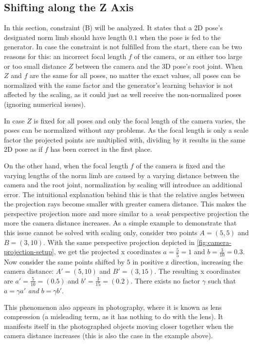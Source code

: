 	
\subsection{Shifting along the Z Axis}
\label{sec:z-shift-error}

In this section, constraint (B) will be analyzed.
It states that a 2D pose's designated norm limb should have length $0.1$ when the pose is fed to the generator.
In case the constraint is not fulfilled from the start, there can be two reasons for this: 
an incorrect focal length $f$ of the camera, or an either too large or too small distance $Z$ between the camera and the 3D pose's root joint.
When $Z$ and $f$ are the same for all poses, no matter the exact values, all poses can be normalized with the same factor and the generator's learning behavior is not affected by the scaling, as it could just as well receive the non-normalized poses (ignoring numerical issues).

In case $Z$ is fixed for all poses and only the focal length of the camera varies, the poses can be normalized without any problems.
As the focal length is only a scale factor the projected points are multiplied with, dividing by it results in the same 2D pose as if $f$ has been correct in the first place.

On the other hand, when the focal length $f$ of the camera is fixed and the varying lengths of the norm limb are caused by a varying distance between the camera and the root joint, normalization by scaling will introduce an additional error.
The intuitional explanation behind this is that the relative angles between the projection rays become smaller with greater camera distance.
This makes the perspective projection more and more similar to a \emph{weak} perspective projection the more the camera distance increases.
As a simple example to demonstrate that this issue cannot be solved with scaling only, consider two points $A = (5, 5)$ and $B = (3, 10)$. 
With the same perspective projection depicted in \autoref{fig:camera-projection-setup}, we get the projected x coordinates $a = \frac{5}{5} = 1$ and $b = \frac{3}{10} = 0.3$.
Now consider the same points shifted by $5$ in positive z direction, increasing the camera distance: $A' = (5, 10)$ and $B' = (3, 15)$.
The resulting x coordinates are $a' = \frac{5}{10} = (0.5)$ and $b' = \frac{3}{15} = (0.2)$.
There exists no factor $\gamma$ such that $a = \gamma a'$ \emph{and} $b = \gamma b'$.

This phenomenon also appears in photography, where it is known as lens compression (a misleading term, as it has nothing to do with the lens).
It manifests itself in the photographed objects moving closer together when the camera distance increases (this is also the case in the example above).


